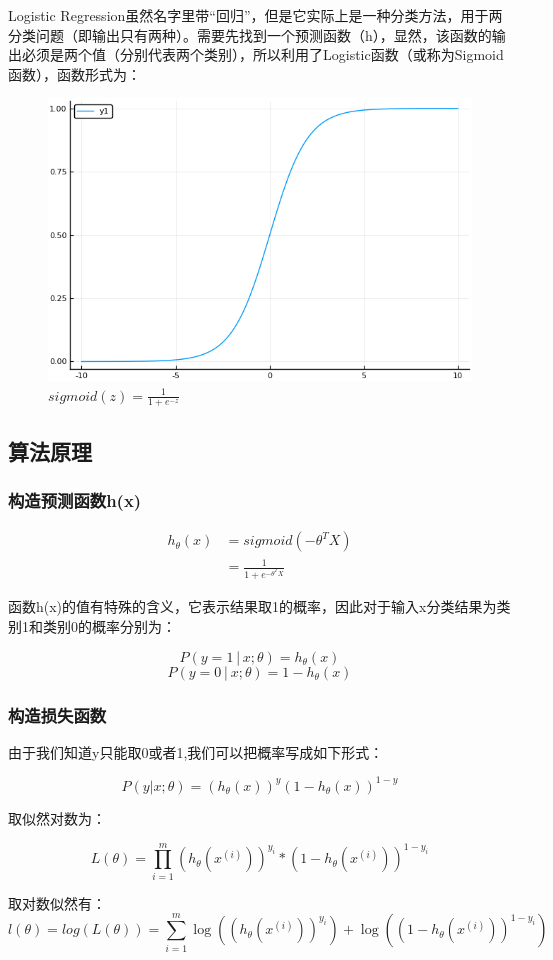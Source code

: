 \documentclass{ML}
\begin{document}
Logistic Regression虽然名字里带“回归”，但是它实际上是一种分类方法，用于两分类问题（即输出只有两种）。需要先找到一个预测函数（h），显然，该函数的输出必须是两个值（分别代表两个类别），所以利用了Logistic函数（或称为Sigmoid函数），函数形式为：

\begin{figure}[H]
	\centering
	\includegraphics[width=0.36\linewidth]{media/sigmoid}
	\caption{$sigmoid(z) = \frac{1}{1 + e^{-z}}$}
	\label{fig:sigmoid}
\end{figure}

\subsection{算法原理}

\subsubsection{构造预测函数h(x)}

$$\begin{array}{ll}
		h_\theta(x) & = sigmoid(-\theta^TX)          \\
		            & = \frac{1}{1 + e^{-\theta^TX}}
	\end{array}$$

函数h(x)的值有特殊的含义，它表示结果取1的概率，因此对于输入x分类结果为类别1和类别0的概率分别为：

$$P(y=1│x;\theta)=h_\theta (x)$$
$$P(y=0│x;\theta)=1-h_\theta(x)$$

\subsubsection{构造损失函数}

由于我们知道y只能取0或者1,我们可以把概率写成如下形式：

$$P(y|x;\theta) = (h_\theta(x))^y(1-h_\theta(x))^{1-y}$$

取似然对数为：

$$L(\theta)=\prod_{i=1}^{m} {(h_{\theta}(x^{(i)}))^{y_i}} *{(1-h_{\theta}(x^{(i)}))^{1-y_i}}$$

取对数似然有：
$$l(\theta)=log(L(\theta))=\sum_{i=1}^{m}\log({(h_{\theta}(x^{(i)}))^{y_i}}) + \log({(1-h_{\theta}(x^{(i)}))^{1-y_i}})$$
\end{document}
